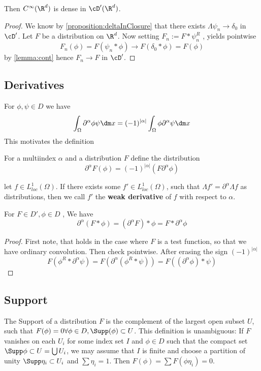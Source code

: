 \begin{corollary}
	Then $C^\infty(\R^d)$ is dense in $\cD'(\R^d)$.
\end{corollary}
\begin{proof}
	We know by \ref{proposition:deltaInClosure} that there exists $\Lambda \psi_n \to \delta_0$ in $\cD'$.
	Let $F$ be a distribution on $\R^d$. Now setting $F_n := F * \psi_n^R$ , yields pointwise
	\[
	F_n(\phi) = F (\psi_n * \phi) \to F(\delta_0 * \phi) = F (\phi)
	\]
	by \ref{lemma:cont}
	hence $F_n \to F$ in $\cD'$.  %

\end{proof}
\subsection{Derivatives}
For $\phi , \psi \in D$ we have
\[
\int_\Omega \partial^\alpha \phi \psi \dm x = (-1)^{|\alpha|} \int_\Omega \phi \partial^\alpha \psi \dm x
\]
This motivates the definition
\begin{definition}
	For a multiindex $\alpha$ and a distribution $F$ define the distribution
	\[\partial^\alpha F (\phi) = (-1)^{|\alpha|}(F \partial^\alpha \phi)\]
\end{definition}
\begin{remark}
	let $f \in L^1_{loc}(\Omega)$. If there exists some $f' \in L^1_{loc}(\Omega)$, such that $\Lambda f' = \partial^\alpha \Lambda  f$ as distributions, then we call $f'$ the {\bf weak derivative} of $f$ with respect to $\alpha$.
\end{remark}
\begin{proposition}
	For $F \in D', \phi \in D $ , We have
	\[\partial^\alpha (F * \phi) = (\partial^\alpha F) * \phi = F * \partial^\alpha \phi\]
\end{proposition}
\begin{proof}
	First note, that holds in the case where $F$ is a test function, so that we have ordinary convolution.
	Then check pointwise. After erasing the sign $(-1)^{|\alpha|}$
	\[
	F(\phi^R * \partial^\alpha \psi) = F(\partial^\alpha (\phi^R * \psi)) = F((\partial^\alpha \phi) * \psi)
	\]

\end{proof}
\subsection{Support}
The Support of a distribution $F$ is the complement of the largest open subset $U$, such that $F(\phi) = 0 \forall \phi \in D, \Supp(\phi) \subset U$.  This definition is unambiguous: If $F$ vanishes on each $U_i$ for some index set $I$ and $\phi \in D$ such that the compact set $\Supp \phi \subset U = \bigcup U_i$, we may assume that $I$ is finite and choose a partition of unity $\Supp \eta_i \subset U_i$ and $\sum \eta_i = 1$. Then $F(\phi) = \sum F(\phi \eta_i) = 0$.
